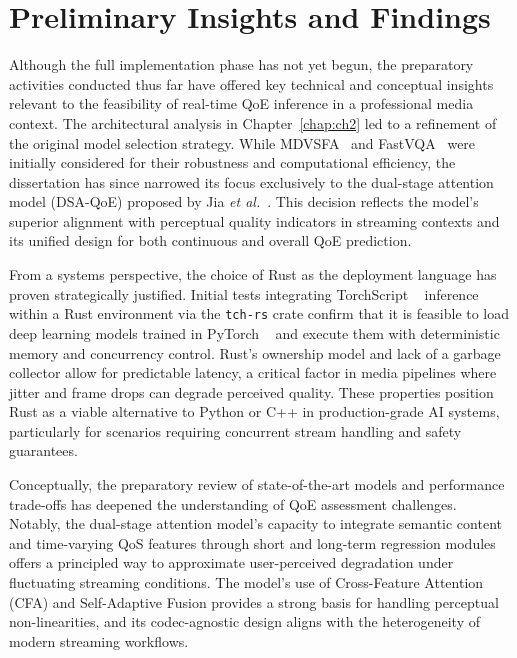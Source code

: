 \section{Preliminary Insights and Findings}

Although the full implementation phase has not yet begun, the preparatory activities conducted thus far have offered key technical and conceptual insights relevant to the feasibility of real-time QoE inference in a professional media context. The architectural analysis in Chapter~\ref{chap:ch2} led to a refinement of the original model selection strategy. While MDVSFA~\cite{li2023unified} and FastVQA~\cite{wu2022fastvqa} were initially considered for their robustness and computational efficiency, the dissertation has since narrowed its focus exclusively to the dual-stage attention model (DSA-QoE) proposed by Jia \textit{et al.}~\cite{jia2024continuous}. This decision reflects the model's superior alignment with perceptual quality indicators in streaming contexts and its unified design for both continuous and overall QoE prediction.

From a systems perspective, the choice of Rust as the deployment language has proven strategically justified. Initial tests integrating TorchScript ~\cite{paszke2019pytorch} inference within a Rust environment via the \texttt{tch-rs} crate confirm that it is feasible to load deep learning models trained in PyTorch ~\cite{paszke2019pytorch} and execute them with deterministic memory and concurrency control. Rust’s ownership model and lack of a garbage collector allow for predictable latency, a critical factor in media pipelines where jitter and frame drops can degrade perceived quality. These properties position Rust as a viable alternative to Python or C++ in production-grade AI systems, particularly for scenarios requiring concurrent stream handling and safety guarantees.

Conceptually, the preparatory review of state-of-the-art models and performance trade-offs has deepened the understanding of QoE assessment challenges. Notably, the dual-stage attention model’s capacity to integrate semantic content and time-varying QoS features through short and long-term regression modules offers a principled way to approximate user-perceived degradation under fluctuating streaming conditions. The model’s use of Cross-Feature Attention (CFA) and Self-Adaptive Fusion provides a strong basis for handling perceptual non-linearities, and its codec-agnostic design aligns with the heterogeneity of modern streaming workflows.

